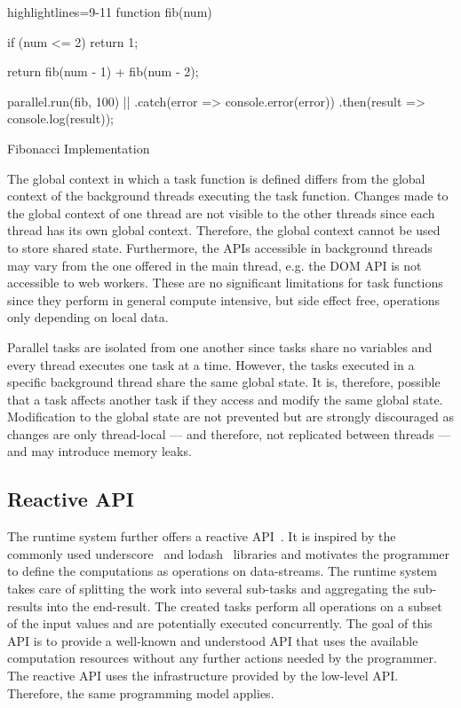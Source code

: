 \begin{listing}
	\begin{javascriptcode*}{highlightlines={9-11}}
function fib(num) {
	if (num <= 2) {
    	return 1;
	}

	return fib(num - 1) + fib(num - 2);
}
        
parallel.run(fib, 100) |$\label{code:parallel-run}$|
	.catch(error => console.error(error))
	.then(result => console.log(result));	
	\end{javascriptcode*}

	\caption{Fibonacci Implementation}
	\label{fig:fibonacci-implementation}
\end{listing}


The global context in which a task function is defined differs from the global context of the background threads executing the task function. Changes made to the global context of one thread are not visible to the other threads since each thread has its own global context. Therefore, the global context cannot be used to store shared state. Furthermore, the APIs accessible in background threads may vary from the one offered in the main thread, e.g. the DOM API is not accessible to web workers. These are no significant limitations for task functions since they perform in general compute intensive, but side effect free, operations only depending on local data.

Parallel tasks are isolated from one another since tasks share no variables and every thread executes one task at a time. However, the tasks executed in a specific background thread share the same global state. It is, therefore, possible that a task affects another task if they access and modify the same global state. Modification to the global state are not prevented but are strongly discouraged as changes are only thread-local --- and therefore, not replicated between threads --- and may introduce memory leaks. 

\subsection{Reactive API}
The runtime system further offers a reactive API~\cite{Meijer2012}. It is inspired by the commonly used underscore~\cite{underscorejs} and lodash~\cite{lodash} libraries and motivates the programmer to define the computations as operations on data-streams. The runtime system takes care of splitting the work into several sub-tasks and aggregating the sub-results into the end-result. The created tasks perform all operations on a subset of the input values and are potentially executed concurrently. The goal of this API is to provide a well-known and understood API that uses the available computation resources without any further actions needed by the programmer. The reactive API uses the infrastructure provided by the low-level API. Therefore, the same programming model applies.


